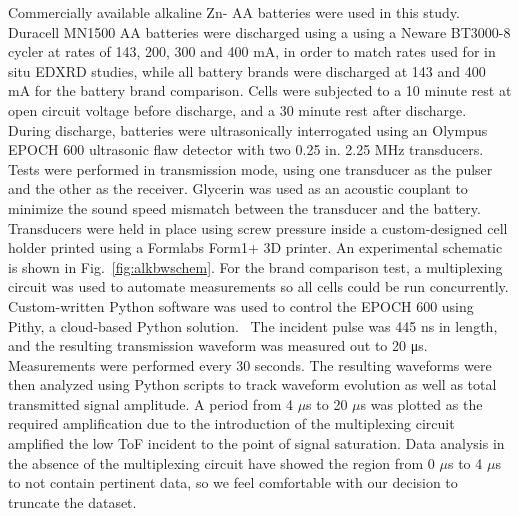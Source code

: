 Commercially available alkaline Zn- AA batteries were used in this study. Duracell MN1500 AA batteries were discharged using a using a Neware BT3000-8 cycler at rates of 143, 200, 300 and 400 mA, in order to match rates used for in situ EDXRD studies, while all battery brands were discharged at 143 and 400 mA for the battery brand comparison. Cells were subjected to a 10 minute rest at open circuit voltage before discharge, and a 30 minute rest after discharge. During discharge, batteries were ultrasonically interrogated using an Olympus EPOCH 600 ultrasonic flaw detector with two 0.25 in. 2.25 MHz transducers. Tests were performed in transmission mode, using one transducer as the pulser and the other as the receiver. Glycerin was used as an acoustic couplant to minimize the sound speed mismatch between the transducer and the battery. Transducers were held in place using screw pressure inside a custom-designed cell holder printed using a Formlabs Form1+ 3D printer. An experimental schematic is shown in Fig.~\ref{fig:alkbwschem}. For the brand comparison test, a multiplexing circuit was used to automate measurements so all cells could be run concurrently. Custom-written Python software was used to control the EPOCH 600 using Pithy, a cloud-based Python solution.~\cite{Steingart_undated-rr} The incident pulse was 445 ns in length, and the resulting transmission waveform was measured out to 20 μs. Measurements were performed every 30 seconds. The resulting waveforms were then analyzed using Python scripts to track waveform evolution as well as total transmitted signal amplitude. A period from 4 $\mu$s to 20 $\mu$s was plotted as the required amplification due to the introduction of the multiplexing circuit amplified the low ToF incident to the point of signal saturation. Data analysis in the absence of the multiplexing circuit have showed the region from 0 $\mu$s to 4 $\mu$s to not contain pertinent data, so we feel comfortable with our decision to truncate the dataset. 

